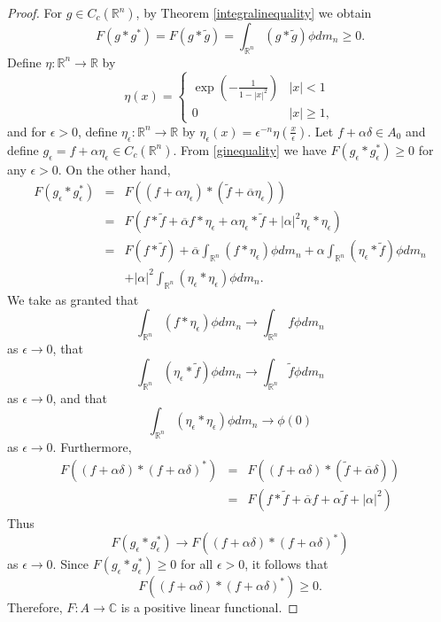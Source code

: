 \documentclass{article}
\theoremstyle{definition}
\begin{document}
\begin{proof}
For $g \in C_c(\mathbb{R}^n)$, by Theorem \ref{integralinequality} we obtain
\begin{equation}
F(g*g^*)=F(g*\widetilde{g})=\int_{\mathbb{R}^n} (g*\widetilde{g}) \phi dm_n \geq 0.
\label{ginequality}
\end{equation}
Define  $\eta:\mathbb{R}^n \to \mathbb{R}$ by
\[
\eta(x) = \begin{cases}
\exp\left(-\frac{1}{1-|x|^2}\right)&|x|<1\\
0&|x| \geq 1,
\end{cases}
\]
and for $\epsilon>0$, define $\eta_\epsilon:\mathbb{R}^n \to \mathbb{R}$ by $\eta_\epsilon(x) = \epsilon^{-n} \eta\left(\frac{x}{\epsilon}\right)$.
Let $f+\alpha \delta \in A_0$ and define
$g_\epsilon = f+\alpha \eta_\epsilon \in C_c(\mathbb{R}^n)$. 
From \eqref{ginequality} we have $F(g_\epsilon*g_\epsilon^*) \geq 0$ for any $\epsilon>0$. 
On the other hand,
\begin{eqnarray*}
F(g_\epsilon*g_\epsilon^*)&=&F((f+\alpha \eta_\epsilon)*(\widetilde{f}+\overline{\alpha}\eta_\epsilon))\\
&=&F(f*\widetilde{f}+\overline{\alpha} f*\eta_\epsilon+\alpha \eta_\epsilon*\widetilde{f}+|\alpha|^2 \eta_\epsilon*\eta_\epsilon)\\
&=&F(f*\widetilde{f})+\overline{\alpha} \int_{\mathbb{R}^n} (f*\eta_\epsilon)\phi dm_n + \alpha \int_{\mathbb{R}^n} (\eta_\epsilon*\widetilde{f})\phi dm_n\\
&&+|\alpha|^2 \int_{\mathbb{R}^n} (\eta_\epsilon*\eta_\epsilon)\phi dm_n.
\end{eqnarray*}
We take as granted that
\[
\int_{\mathbb{R}^n} (f*\eta_\epsilon)\phi dm_n \to \int_{\mathbb{R}^n} f\phi dm_n
\]
as $\epsilon \to 0$,
 that
\[
\int_{\mathbb{R}^n} (\eta_\epsilon * \widetilde{f})\phi dm_n \to \int_{\mathbb{R}^n} \widetilde{f} \phi dm_n
\]
as $\epsilon \to 0$, and that
\[
\int_{\mathbb{R}^n} (\eta_\epsilon*\eta_\epsilon)\phi dm_n \to \phi(0)
\]
as $\epsilon \to 0$.
Furthermore, 
\begin{eqnarray*}
F((f+\alpha \delta)*(f+\alpha \delta)^*)&=&F((f+\alpha \delta)*(\widetilde{f}+\overline{\alpha}\delta))\\
&=&F(f*\widetilde{f}+\overline{\alpha}f+\alpha \widetilde{f}+|\alpha|^2)
\end{eqnarray*}
Thus
\[
F(g_\epsilon*g_\epsilon^*) \to F((f+\alpha \delta)*(f+\alpha \delta)^*)
\]
as $\epsilon \to 0$. Since $F(g_\epsilon * g_\epsilon^*) \geq 0$ for all $\epsilon>0$, it follows that
\[
F((f+\alpha \delta)*(f+\alpha \delta)^*) \geq 0.
\]
Therefore, $F:A \to \mathbb{C}$ is a positive linear functional.


\end{proof}
\end{document}
